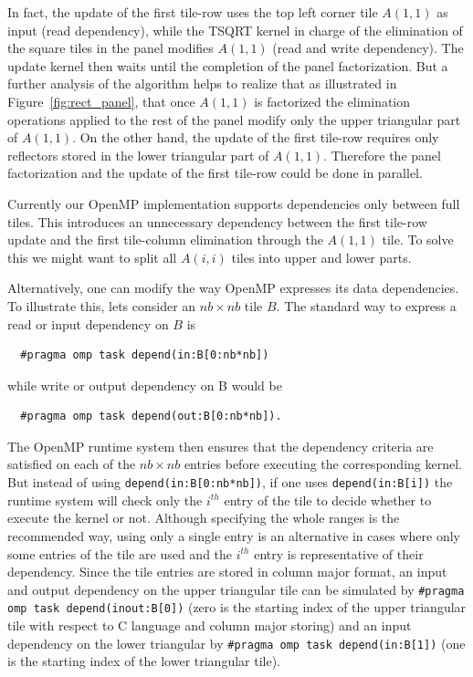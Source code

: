 In fact, the update of the first tile-row uses the top
left corner tile $A(1,1)$ as input (read dependency), while the TSQRT
kernel in charge of the elimination of the square tiles in the panel
modifies $A(1,1)$ (read and write dependency). The update kernel then
waits until the completion of the panel factorization. But a further
analysis of the algorithm helps to realize that as illustrated in
Figure~\ref{fig:rect_panel}, that once $A(1,1)$ is factorized the
elimination operations applied to the rest of the panel modify only
the upper triangular part of $A(1,1)$. On the other hand, the update
of the first tile-row requires only reflectors stored in the lower
triangular part of $A(1,1)$.
Therefore the panel factorization and the update of
the first tile-row could be done in parallel.

Currently our OpenMP implementation supports dependencies only
between full tiles.
This introduces an unnecessary dependency between
the first tile-row update and the first tile-column
elimination through the $A(1,1)$ tile.
To solve this we might want to
split all $A(i,i)$ tiles into upper and lower parts.

Alternatively, one can modify the way OpenMP expresses
its data dependencies.
To illustrate this, lets consider an $nb \times nb$ tile $B$.
The standard way to express a read or input dependency on $B$ is
\begin{lstlisting}
  #pragma omp task depend(in:B[0:nb*nb])
\end{lstlisting}
while write or output dependency on B would be
\begin{lstlisting}
  #pragma omp task depend(out:B[0:nb*nb]).
\end{lstlisting}

The OpenMP runtime system then ensures that the dependency criteria
are satisfied on each of the $nb \times nb$ entries before executing
the corresponding kernel. But instead of using
\texttt{depend(in:B[0:nb*nb])}, if one uses \texttt{depend(in:B[i])}
the runtime system will check only the $i^{th}$ entry of the tile to
decide whether to execute the kernel or not. Although specifying the
whole ranges is the recommended way, using only a single entry is an
alternative in cases where only some entries of the tile are used and
the $i^{th}$ entry is representative of their dependency. Since the
tile entries are stored in column major format, an input and output
dependency on the upper triangular tile can be simulated by
\texttt{\#pragma omp task depend(inout:B[0])} (zero is the starting
index of the upper triangular tile with respect to C language and
column major storing) and an input dependency on the
lower triangular by \texttt{\#pragma omp task depend(in:B[1])} (one is
the starting index of the lower triangular tile).

